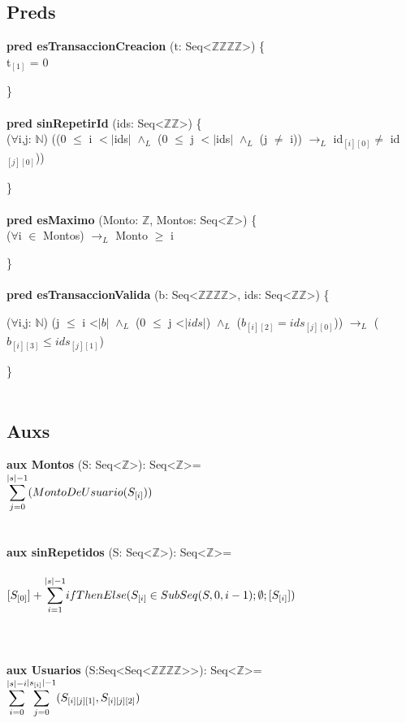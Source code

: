 \documentclass{article}
\newcommand{\Entero}{$\mathds{Z}$}
\newcommand{\Natural}{$\mathds{N}$}
\newcommand{\tuplaDeDosEnteros}{Seq\textless\Entero\texttimes\Entero\textgreater}
\newcommand{\tuplaDeCuatroEnteros}{Seq\textless\Entero\texttimes\Entero\texttimes\Entero\texttimes\Entero\textgreater}
\newcommand{\tuplaDeTuplaDeCuatroEnteros}{{Seq\textless Seq\textless\Entero\texttimes\Entero\texttimes\Entero\texttimes\Entero\textgreater\textgreater}}
\begin{document}
\subsection*{Preds}
    \textbf{pred esTransaccionCreacion} (t: \tuplaDeCuatroEnteros) \{\\
        \indent\indent t$_{[1]}$ = 0

    \}\\\\

    \textbf{pred sinRepetirId} (ids: \tuplaDeDosEnteros) \{\\
        \indent\indent($\forall$i,j: \Natural) ((0 $\leq$ i $<|$ids$|$ $\land_L$ (0 $\leq$ j $<|$ids$|$ $\land_L$ (j $\neq$ i))
                        $\rightarrow_L$ id$_{[i][0]} \neq$ id$_{[j][0]}$))
                        
    \}\\\\

    \textbf{pred esMaximo} (Monto: \Entero, Montos: Seq\textless$\mathds{Z}$\textgreater) \{\\
        \indent\indent($\forall$i $\in$ Montos) $\rightarrow_L$ Monto $\geq$ i

    \}\\\\

    \textbf{pred esTransaccionValida} (b: \tuplaDeCuatroEnteros, ids: \tuplaDeDosEnteros) \{

        \indent\indent($\forall$i,j: \Natural) (j $\leq$ i \textless $|b|$ $\land_L$ (0 $\leq$ j \textless $|ids|$) $\land_L$ ($b_{[i][2]} = ids_{[j][0]}$))
                                                $\rightarrow_L$ ($b_{[i][3]} \leq ids_{[j][1]}$)

    \}\\\\

\subsection*{Auxs}
    \textbf{aux Montos} (S: Seq\textless$\mathds{Z}$\textgreater): Seq\textless$\mathds{Z}$\textgreater = \\

        \indent\indent $\mathlarger\sum\limits_{j=0}^{|s|-1} (MontoDeUsuario(S_{[i]}))$\\\\\\

    \textbf{aux sinRepetidos} (S: Seq\textless$\mathds{Z}$\textgreater): Seq\textless$\mathds{Z}$\textgreater =\\\\
        \indent\indent $[S_{[0]}] + \mathlarger\sum\limits_{i=1}^{|s|-1} ifThenElse(S_{[i]} \in SubSeq(S, 0, i-1); \emptyset; [S_{[i]}])$ \\\\\\\\

    \textbf{aux Usuarios} (S:\tuplaDeTuplaDeCuatroEnteros): Seq\textless$\mathds{Z}$\textgreater=\\

    \indent\indent $\mathlarger\sum\limits_{i=0}^{|s|-i} \mathlarger\sum\limits_{j=0}^{|s_{[i]}|-1} (S_{[i][j][1]}, S_{[i][j][2]})$\\\\\\
\end{document}
